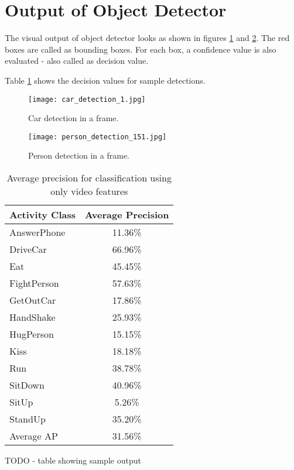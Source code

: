 \section{Output of Object Detector}

The visual output of object detector looks as shown in figures \ref{fig:CarDetection} and \ref{fig:PersonDetection}. 
The red boxes are called as bounding boxes.
For each box, a confidence value is also evaluated - also called as decision value.

Table \ref{table:ObjDetection} shows the decision values for sample detections.

\begin{figure}[here]
\begin{center} 
\texttt{[image: car\_detection\_1.jpg]} 
\caption{ Car detection in a frame. \label{fig:CarDetection}} 
\end{center} 
\end{figure}  

\begin{figure}[here]
\begin{center} 
\texttt{[image: person\_detection\_151.jpg]} 
\caption{ Person detection in a frame. \label{fig:PersonDetection}} 
\end{center} 
\end{figure}  


\begin{table}[t]
\centering
\begin{tabular}{| l | c |}
\hline
{\bf Activity Class} & {\bf Average Precision} \\ \hline
%
AnswerPhone & 11.36\% \\ \hline
DriveCar & 66.96\% \\ \hline
Eat & 45.45\% \\ \hline
FightPerson & 57.63\% \\ \hline
GetOutCar & 17.86\% \\ \hline
HandShake & 25.93\% \\ \hline
HugPerson & 15.15\% \\ \hline
Kiss & 18.18\% \\ \hline
Run & 38.78\% \\ \hline
SitDown & 40.96\% \\ \hline
SitUp & 5.26\% \\ \hline
StandUp & 35.20\% \\ \hline
Average AP & 31.56\% \\ \hline
%
\end{tabular}
\caption{Average precision for classification using only video features}
\label{table:ObjDetection}
\end{table}



TODO - table showing sample output
